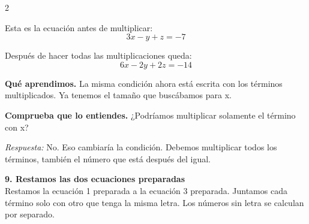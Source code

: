 \documentclass[11pt,a4paper,landscape]{article}
\begin{document}
\begin{multicols*}{2}
\begin{minipage}{\linewidth}
\par\smallskip Esta es la ecuación antes de multiplicar:
\[3x - y + z = -7\]
\par{}\par\smallskip
\par\smallskip Después de hacer todas las multiplicaciones queda:
\[6x - 2y + 2z = -14\]
\par\smallskip\textbf{Qué aprendimos.} La misma condición ahora está escrita con los términos multiplicados. Ya tenemos el tamaño que buscábamos para x.
\par\smallskip\textbf{Comprueba que lo entiendes.} ¿Podríamos multiplicar solamente el término con x?\par\textit{Respuesta:} No. Eso cambiaría la condición. Debemos multiplicar todos los términos, también el número que está después del igual.
\end{minipage}\par\medskip
\noindent\begin{minipage}{\linewidth}\textbf{9. Restamos las dos ecuaciones preparadas}\\[2pt]Restamos la ecuación 1 preparada a la ecuación 3 preparada. Juntamos cada término solo con otro que tenga la misma letra. Los números sin letra se calculan por separado.
\par{}\par\smallskip

\end{minipage}
\end{multicols*}
\end{document}
